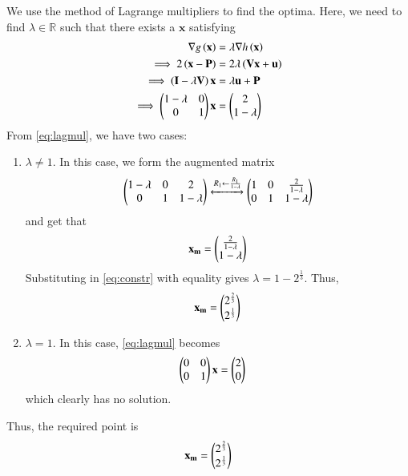\documentclass[journal,12pt,twocolumn]{IEEEtran}
\renewcommand{\vec}[1]{\boldsymbol{\mathbf{#1}}}
\begin{document}
\begin{enumerate}
    We use the method of Lagrange multipliers to find the optima. Here, we need 
    to find $\lambda \in \mathbb{R}$ such that there exists a $\vec{x}$ 
    satisfying
    \begin{align}
        \nabla g\brak{\vec{x}} &= \lambda\nabla h\brak{\vec{x}} \\
        \implies 2\brak{\vec{x}-\vec{P}} &= 2\lambda\brak{\vec{Vx}+\vec{u}} \\
        \implies \brak{\vec{I}-\lambda\vec{V}}\vec{x} &= \lambda\vec{u} + \vec{P} \\
        \implies \myvec{1-\lambda&0\\0&1}\vec{x} &= \myvec{2\\1-\lambda}
        \label{eq:lagmul}
    \end{align}
    From \eqref{eq:lagmul}, we have two cases:
    \begin{enumerate}
        \item $\lambda \neq 1$. In this case, we form the augmented matrix
        \begin{align}
            \begin{pmatrix}1-\lambda&0&2\\0&1&1-\lambda\end{pmatrix} \xleftrightarrow[]{R_1 \leftarrow \frac{R_1}{1-\lambda}} \begin{pmatrix}1&0&\frac{2}{1-\lambda}\\0&1&1-\lambda\end{pmatrix}
        \end{align}
        and get that
        \begin{align}
            \vec{x_m} = \myvec{\frac{2}{1-\lambda}\\1-\lambda}
        \end{align}
        Substituting in \eqref{eq:constr} with equality gives 
        $\lambda = 1 - 2^{\frac{1}{3}}$. Thus, 
        \begin{align}
            \vec{x_m} = \myvec{2^{\frac{2}{3}}\\2^{\frac{1}{3}}}
        \end{align}

        \item $\lambda = 1$. In this case, \eqref{eq:lagmul} becomes
        \begin{align}
            \myvec{0&0\\0&1}\vec{x} &= \myvec{2\\0}
        \end{align}
        which clearly has no solution.
    \end{enumerate}

    Thus, the required point is
    \begin{align}
        \vec{x_m} = \myvec{2^{\frac{2}{3}}\\2^{\frac{1}{3}}}
    \end{align}
\end{enumerate}
\end{document}
